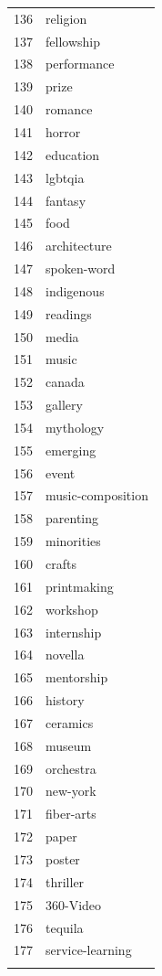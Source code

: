 \documentclass[12pt]{report}   %
\begin{document}
\begin{figure}[h]
\begin{minipage}{0.24\textwidth}
\begin{tabular}[h]{rl}
  136 & religion \\ 
  137 & fellowship \\ 
  138 & performance \\ 
  139 & prize \\ 
  140 & romance \\ 
  141 & horror \\ 
  142 & education \\ 
  143 & lgbtqia \\ 
  144 & fantasy \\ 
  145 & food \\ 
  146 & architecture \\ 
  147 & spoken-word \\ 
  148 & indigenous \\ 
  149 & readings \\ 
  150 & media \\ 
  151 & music \\ 
  152 & canada \\ 
  153 & gallery \\ 
  154 & mythology \\ 
  155 & emerging \\ 
  156 & event \\ 
  157 & music-composition \\ 
  158 & parenting \\ 
  159 & minorities \\ 
  160 & crafts \\ 
  161 & printmaking \\ 
  162 & workshop \\ 
  163 & internship \\ 
  164 & novella \\ 
  165 & mentorship \\ 
  166 & history \\ 
  167 & ceramics \\ 
  168 & museum \\ 
  169 & orchestra \\ 
  170 & new-york \\ 
  171 & fiber-arts \\ 
  172 & paper \\ 
  173 & poster \\ 
  174 & thriller \\ 
  175 & 360-Video \\ 
  176 & tequila \\ 
  177 & service-learning \\ 
   \hline
\vspace{.82cm}
\end{tabular}

    \end{minipage}
\end{figure}
\end{document}
